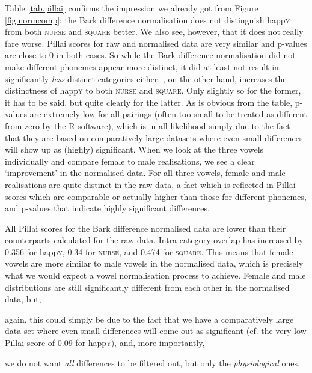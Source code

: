 Table \ref{tab.pillai} confirms the impression we already got from Figure \ref{fig.normcomp}: the Bark difference normalisation does not distinguish happ\textsc{y} from both \textsc{nurse} and \textsc{square} better.
We also see, however, that it does not really fare worse.
Pillai scores for raw and normalised data are very similar and p-values are close to 0 in both cases.
So while the Bark difference normalisation did not make different phonemes appear more distinct, it did at least not result in significantly \emph{less} distinct categories either.
\citeauthor{wattfabricius2002}, on the other hand, increases the distinctness of happ\textsc{y} to both \textsc{nurse} and \textsc{square}.
Only slightly so for the former, it has to be said, but quite clearly for the latter.
As is obvious from the table, p-values are extremely low for all pairings (often too small to be treated as different from zero by the R software), which is in all likelihood simply due to the fact that they are based on comparatively large datasets where even small differences will show up as (highly) significant.
When we look at the three vowels individually and compare female to male realisations, we see a clear `improvement' in the normalised data.
For all three vowels, female and male realisations are quite distinct in the raw data, a fact which is reflected in Pillai scores which are comparable or actually higher than those for different phonemes, and p-values that indicate highly significant differences. 

All Pillai scores for the Bark difference normalised data are lower than their counterparts calculated for the raw data.
Intra-category overlap has increased by 0.356 for happ\textsc{y}, 0.34 for \textsc{nurse}, and 0.474 for \textsc{square}.
This means that female vowels are more similar to male vowels in the normalised data, which is precisely what we would expect a vowel normalisation process to achieve.
Female and male distributions are still significantly different from each other in the normalised data, but,
\begin{inparaenum}[(a)]
	\item again, this could simply be due to the fact that we have a comparatively large data set where even small differences will come out as significant (cf. the very low Pillai score of 0.09 for happ\textsc{y}), and, more importantly,
	\item we do not want \emph{all} differences to be filtered out, but only the \emph{physiological} ones.
\end{inparaenum}

